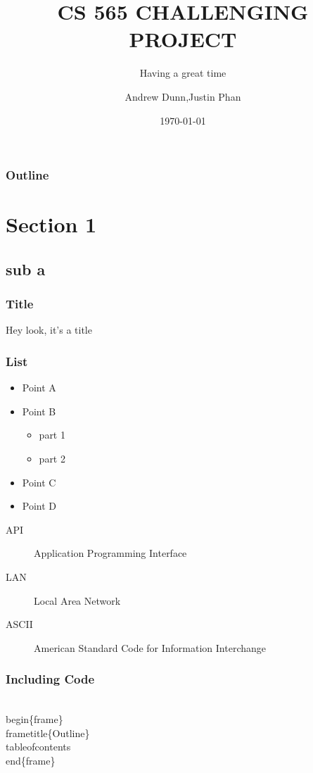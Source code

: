 \documentclass{beamer}
\title{CS 565 CHALLENGING PROJECT}
\subtitle{Having a great time}
\author{Andrew Dunn,Justin Phan}
\institute{Central Washington University}
\date{\today}
\begin{document}
    \begin{frame}
        \titlepage
    \end{frame}
    
    \begin{frame}
        \frametitle{Outline}
        \tableofcontents
    \end{frame}
    
    \section{Section 1}
    \subsection{sub a}
     
    \begin{frame}
        \frametitle{Title}
        Hey look, it's a \alert{title}
    \end{frame}
    
    \begin{frame}
        \frametitle{List}
        \begin{itemize}
            \item Point A
            \item Point B
            \begin{itemize}
                \item part 1
                \item part 2
            \end{itemize}
            \item Point C
            \item Point D
        \end{itemize}
    \end{frame}
    
    \begin{frame}
        \begin{description}
            \item[API] Application Programming Interface
            \item[LAN] Local Area Network
            \item[ASCII] American Standard Code for Information Interchange
        \end{description}
    \end{frame}
    
    \begin{frame}[fragile]
        \frametitle{Including Code}
        \begin{semiverbatim}
            \\begin\{frame\}
            \\frametitle\{Outline\}
            \\tableofcontents
            \\end\{frame\}
        \end{semiverbatim}
    \end{frame}
    
\end{document}
